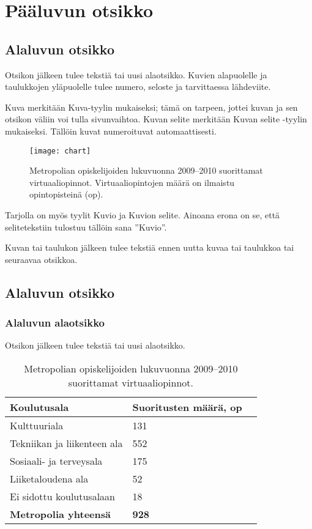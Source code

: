 \chapter{Pääluvun otsikko}

\section{Alaluvun otsikko}
Otsikon jälkeen tulee tekstiä tai uusi alaotsikko. Kuvien alapuolelle ja taulukkojen yläpuolelle tulee numero, seloste ja tarvittaessa lähdeviite.

Kuva merkitään Kuva-tyylin mukaiseksi; tämä on tarpeen, jottei kuvan ja sen otsikon väliin voi tulla sivunvaihtoa. Kuvan selite merkitään Kuvan selite -tyylin mukaiseksi. Tällöin kuvat numeroituvat automaattisesti.

\begin{figure}[h]
  \texttt{[image: chart]}
  \caption{Metropolian opiskelijoiden lukuvuonna 2009–2010 suorittamat virtuaaliopinnot. Virtuaaliopintojen määrä on ilmaistu opintopisteinä (op).}
  \label{fig:chart}
\end{figure}

Tarjolla on myös tyylit Kuvio ja Kuvion selite. Ainoana erona on se, että selitetekstiin tulostuu tällöin sana ”Kuvio”.

Kuvan tai taulukon jälkeen tulee tekstiä ennen uutta kuvaa tai taulukkoa tai seuraavaa otsikkoa.

\section{Alaluvun otsikko}

\subsection{Alaluvun alaotsikko}

Otsikon jälkeen tulee tekstiä tai uusi alaotsikko.

\begin{table}[h]
  \caption{Metropolian opiskelijoiden lukuvuonna 2009–2010 suorittamat virtuaaliopinnot.}
  \begin{tabular}{| l | l | l |}
  \hline
  \bfseries Koulutusala & \bfseries Suoritusten määrä, op \\
  \hline
  Kulttuuriala & 131 \\
  \hline
  Tekniikan ja liikenteen ala & 552 \\
  \hline
  Sosiaali- ja terveysala & 175 \\
  \hline
  Liiketaloudena ala & 52 \\
  \hline
  Ei sidottu koulutusalaan & 18 \\
  \hline
  \bfseries Metropolia yhteensä & \bfseries 928 \\
  \hline
  \end{tabular}
  \label{tab:virtual studies}
\end{table}


